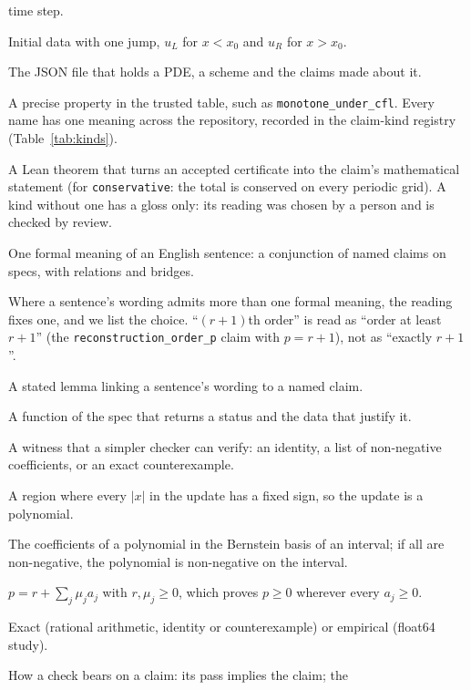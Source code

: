 \documentclass[11pt,a4paper]{article}
\newcommand{\code}[1]{\texttt{#1}}
\begin{document}
\begin{description}[style=nextline]
  time step.
\item[Riemann problem] Initial data with one jump, $u_L$ for $x < x_0$ and $u_R$ for $x > x_0$.
\item[Spec] The JSON file that holds a PDE, a scheme and the claims made about it.
\item[Named claim, claim kind] A precise property in the trusted table, such as
  \code{monotone\_under\_cfl}. Every name has one meaning across the repository, recorded in the
  claim-kind registry (Table~\ref{tab:kinds}).
\item[Meaning theorem] A Lean theorem that turns an accepted certificate into the claim's mathematical
  statement (for \code{conservative}: the total is conserved on every periodic grid). A kind without one
  has a gloss only: its reading was chosen by a person and is checked by review.
\item[Reading] One formal meaning of an English sentence: a conjunction of named claims on specs, with
  relations and bridges.
\item[Reading choices] Where a sentence's wording admits more than one formal meaning, the reading
  fixes one, and we list the choice. ``$(r+1)$th order'' is read as ``order at least $r + 1$'' (the
  \code{reconstruction\_order\_p} claim with $p = r + 1$), not as ``exactly $r + 1$''.
\item[Bridge] A stated lemma linking a sentence's wording to a named claim.
\item[Check, witness] A function of the spec that returns a status and the data that justify it.
\item[Certificate] A witness that a simpler checker can verify: an identity, a list of non-negative
  coefficients, or an exact counterexample.
\item[Sign cell] A region where every $|x|$ in the update has a fixed sign, so the update is a polynomial.
\item[Bernstein coefficients] The coefficients of a polynomial in the Bernstein basis of an interval;
  if all are non-negative, the polynomial is non-negative on the interval.
\item[Farkas identity] $p = r + \sum_j \mu_j a_j$ with $r, \mu_j \ge 0$, which proves $p \ge 0$ wherever
  every $a_j \ge 0$.
\item[Guarantee] Exact (rational arithmetic, identity or counterexample) or empirical (float64 study).
\item[SUFFICIENT, NECESSARY, EQUIVALENT] How a check bears on a claim: its pass implies the claim; the

\end{description}
\end{document}
